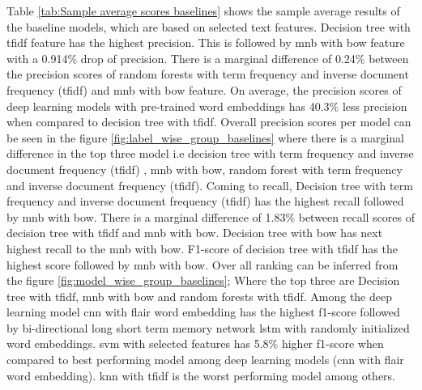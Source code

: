 Table \ref{tab:Sample average scores baselines} shows the sample average results of the baseline models, which are based on selected text features. Decision tree with \acrfull{tfidf} feature has the highest precision. This is followed by \acrfull{mnb} with \acrfull{bow} feature with a 0.914\% drop of precision. There is a marginal difference of 0.24\% between the precision scores of random forests with term frequency and inverse document frequency (\acrshort{tfidf}) and \acrfull{mnb} with \acrfull{bow} feature. On average, the precision scores of deep learning models with pre-trained word embeddings has 40.3\% less precision when compared to decision tree with \acrshort{tfidf}. Overall precision scores per model can be seen in the figure \ref{fig:label_wise_group_baselines} where there is a marginal difference in the top three model i.e decision tree with term frequency and inverse document frequency (\acrshort{tfidf}) , \acrfull{mnb} with  \acrfull{bow}, random forest with term frequency and inverse document frequency (\acrshort{tfidf}). Coming to recall, Decision tree with term frequency and inverse document frequency (\acrshort{tfidf}) has the highest recall followed by \acrfull{mnb} with \acrfull{bow}. There is a marginal difference of 1.83\% between recall scores of decision tree with \acrshort{tfidf} and \acrfull{mnb} with \acrfull{bow}. Decision tree with \acrfull{bow} has next highest recall to the \acrfull{mnb} with \acrfull{bow}. F1-score of decision tree with \acrshort{tfidf} has the highest score followed by \acrfull{mnb} with \acrfull{bow}. Over all ranking can be inferred from the figure \ref{fig:model_wise_group_baselines}; Where the top three are Decision tree with \acrshort{tfidf}, \acrshort{mnb} with \acrshort{bow} and random forests with \acrshort{tfidf}. Among the deep learning model \acrshort{cnn} with flair word embedding has the highest f1-score followed by bi-directional long short term memory network \acrshort{lstm} with randomly initialized word embeddings. \acrfull{svm} with selected features has 5.8\% higher f1-score when compared to best performing model among deep learning models (\acrshort{cnn} with flair word embedding). \acrshort{knn} with \acrshort{tfidf} is the worst performing model among others.

